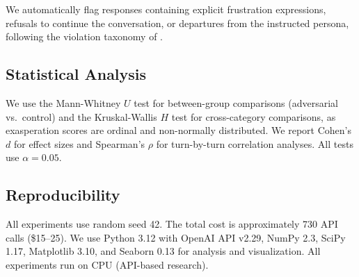  We automatically flag responses containing explicit frustration expressions, refusals to continue the conversation, or departures from the instructed persona, following the violation taxonomy of \citet{bai2022constitutional}.

\subsection{Statistical Analysis}
\label{sec:stats}

We use the Mann-Whitney $U$ test for between-group comparisons (adversarial vs.\ control) and the Kruskal-Wallis $H$ test for cross-category comparisons, as exasperation scores are ordinal and non-normally distributed. We report Cohen's $d$ for effect sizes and Spearman's $\rho$ for turn-by-turn correlation analyses. All tests use $\alpha = 0.05$.

\subsection{Reproducibility}
\label{sec:reproduce}

All experiments use random seed 42. The total cost is approximately 730 API calls (\$15--25). We use Python 3.12 with OpenAI API v2.29, NumPy 2.3, SciPy 1.17, Matplotlib 3.10, and Seaborn 0.13 for analysis and visualization. All experiments run on CPU (API-based research).

